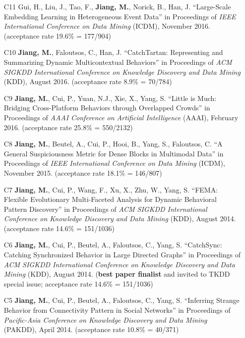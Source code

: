 \documentclass[10pt]{article}
\newenvironment{myindentpar}[1]%
{\begin{list}{}%
         {\setlength{\leftmargin}{#1}}%
         \item[]%
}
{\end{list}}
\newcounter{list}
\begin{document}
\begin{myindentpar}{0.00cm}
\begin{enumerate}[leftmargin=.5cm]
\item[C11] Gui, H., Liu, J., Tao, F., \textbf{Jiang, M.}, Norick, B., Han, J. ``Large-Scale Embedding Learning in Heterogeneous Event Data'' in Proceedings of \textit{IEEE International Conference on Data Mining} (ICDM), November 2016. (acceptance rate 19.6\% = 177/904)

\item[C10] \textbf{Jiang, M.}, Faloutsos, C., Han, J. ``CatchTartan: Representing and Summarizing Dynamic Multicontextual Behaviors'' in Proceedings of \textit{ACM SIGKDD International Conference on Knowledge Discovery and Data Mining} (KDD), August 2016. (acceptance rate 8.9\% = 70/784)

\item[C9] \textbf{Jiang, M.}, Cui, P., Yuan, N.J., Xie, X., Yang, S. ``Little is Much: Bridging Cross-Platform Behaviors through Overlapped Crowds'' in Proceedings of \textit{AAAI Conference on Artificial Intelligence} (AAAI), February 2016. (acceptance rate 25.8\% = 550/2132)

\item[C8] \textbf{Jiang, M.}, Beutel, A., Cui, P., Hooi, B., Yang, S., Faloutsos, C. ``A General Suspiciousness Metric for Dense Blocks in Multimodal Data'' in Proceedings of \textit{IEEE International Conference on Data Mining} (ICDM), November 2015. (acceptance rate 18.1\% = 146/807)

\item[C7] \textbf{Jiang, M.}, Cui, P., Wang, F., Xu, X., Zhu, W., Yang, S. ``FEMA: Flexible Evolutionary Multi-Faceted Analysis for Dynamic Behavioral Pattern Discovery'' in Proceedings of \textit{ACM SIGKDD International Conference on Knowledge Discovery and Data Mining} (KDD), August 2014. (acceptance rate 14.6\% = 151/1036)

\item[C6] \textbf{Jiang, M.}, Cui, P., Beutel, A., Faloutsos, C., Yang, S. ``CatchSync: Catching Synchronized Behavior in Large Directed Graphs'' in Proceedings of \textit{ACM SIGKDD International Conference on Knowledge Discovery and Data Mining} (KDD), August 2014. (\textbf{best paper finalist} and invited to TKDD special issue; acceptance rate 14.6\% = 151/1036)
	
\item[C5] \textbf{Jiang, M.}, Cui, P., Beutel, A., Faloutsos, C., Yang, S. ``Inferring Strange Behavior from Connectivity Pattern in Social Networks'' in Proceedings of \textit{Pacific-Asia Conference on Knowledge Discovery and Data Mining} (PAKDD), April 2014. (acceptance rate 10.8\% = 40/371)


\end{enumerate}
\end{myindentpar}
\end{document}
